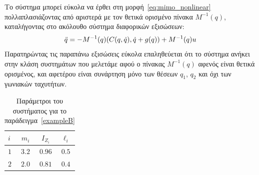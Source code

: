 Το σύστημα μπορεί εύκολα να έρθει στη μορφή~\eqref{eq:mimo_nonlinear} πολλαπλασιάζοντας από αριστερά με τον θετικά ορισμένο πίνακα $M^{-1}(q)$, καταλήγοντας στο ακόλουθο σύστημα διαφορικών εξισώσεων:
\[
\ddot q = - M^{-1}(q) \pqty{C(q,\dot q),\dot q + g(q)} + M^{-1}(q)u 
\]
Παρατηρώντας τις παραπάνω εξισώσεις εύκολα επαληθεύεται ότι το σύστημα ανήκει στην κλάση συστημάτων που μελετάμε αφού ο πίνακας $ M^{-1}(q)$ αφενός είναι θετικά ορισμένος, και αφετέρου είναι συνάρτηση μόνο των θέσεων $q_1$, $q_2$ και όχι των γωνιακών ταχυτήτων.

\begin{table}
	\centering
	\caption{Παράμετροι του συστήματος για το παράδειγμα~\ref{exampleB}}
	\label{tab:2dof_params}
	\begin{tabular}{l | ccc}
		\hline \hline
		$i$ & $m_i$ & $I_{Z_i}$ & $\ell_i$ \\ \hline \hline
		$1$ & $3.2$ & $0.96$ & $0.5$ \\\hline 
		$2$ & $2.0$ & $0.81$ & $0.4$ \\ \hline 
	\end{tabular}
\end{table}


